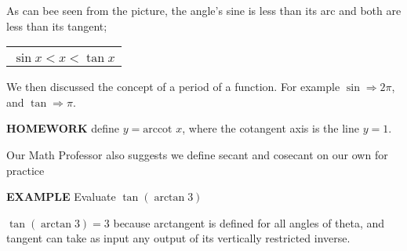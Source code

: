 \documentclass{article}
\begin{document}
\vspace{10pt}

As can bee seen from the picture, the angle's sine is less than its arc and both are less than its tangent;

\begin{center}
\begin{tabular}{|c|}
\hline\\
$\sin x<x<\tan x$\\[1em]
\hline
\end{tabular}
\end{center}

\vspace{10pt}

We then discussed the concept of a period of a function. For example $\sin\Rightarrow2\pi$, and $\tan\Rightarrow\pi$.

\vspace{10pt}

{\bf{}HOMEWORK} define $y=\mbox{arccot }x$, where the cotangent axis is the line $y=1$.

\vspace{10pt}

\begin{center}
\end{center}

\vspace{10pt}

Our Math Professor also suggests we define secant and cosecant on our own for practice

\vspace{10pt}

{\bf{}EXAMPLE} Evaluate $\tan(\arctan3)$

\vspace{10pt}

 $\tan(\arctan3)=3$ because arctangent is defined for all angles of theta, and tangent can take as input any output of its vertically restricted inverse.

\vspace{10pt}
\end{document}
